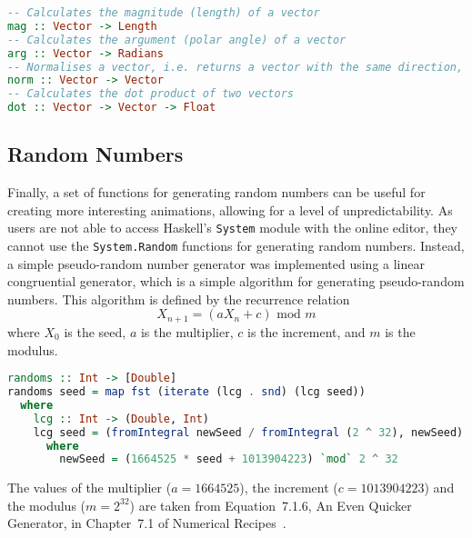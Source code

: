 \documentclass[../main.tex]{subfiles}
\begin{document}
                \begin{lstlisting}[language={Haskell}, label={lst:vectorFns}, caption={The remaining 
                    vector functions.}]
-- Calculates the magnitude (length) of a vector
mag :: Vector -> Length
-- Calculates the argument (polar angle) of a vector
arg :: Vector -> Radians
-- Normalises a vector, i.e. returns a vector with the same direction, but a magnitude of 1
norm :: Vector -> Vector
-- Calculates the dot product of two vectors
dot :: Vector -> Vector -> Float\end{lstlisting}

        \subsection{Random Numbers}
            Finally, a set of functions for generating random numbers can be useful for
                creating more interesting animations, allowing for a level of unpredictability.
            As users are not able to access Haskell's \texttt{System} module with the
                online editor, they cannot use the \texttt{System.Random} functions for
                generating random numbers.
            Instead, a simple pseudo-random number generator was implemented using a linear
                congruential generator, which is a simple algorithm for generating
                pseudo-random numbers.
            This algorithm is defined by the recurrence relation $$X_{n+1} = (aX_n + c)
                    \text{ mod } m$$ where $X_0$ is the seed, $a$ is the multiplier, $c$ is the
                increment, and $m$ is the modulus.

            \begin{lstlisting}[language={Haskell}, label={lst:random}, caption={The random number 
                generator which uses a linear congruential generator to generate  an  infinite list
                of pseudo-random numbers, mapped to the range [0, 1].}]
randoms :: Int -> [Double]
randoms seed = map fst (iterate (lcg . snd) (lcg seed))
  where
    lcg :: Int -> (Double, Int)
    lcg seed = (fromIntegral newSeed / fromIntegral (2 ^ 32), newSeed)
      where
        newSeed = (1664525 * seed + 1013904223) `mod` 2 ^ 32\end{lstlisting}

            The values of the multiplier ($a=1664525$), the increment ($c=1013904223$) and
                the modulus ($m=2^{32}$) are taken from Equation~7.1.6, An Even Quicker
                Generator, in Chapter~7.1 of Numerical Recipes~\citep{numericalRecipes}.
\end{document}
